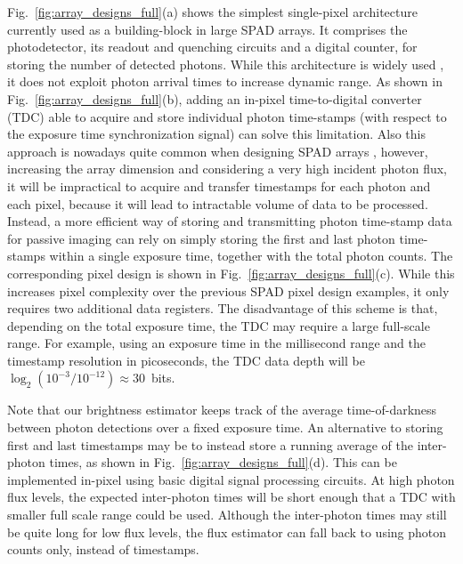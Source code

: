 Fig.~\ref{fig:array_designs_full}(a) shows the simplest single-pixel architecture
currently used as a building-block in large SPAD arrays. It comprises the
photodetector, its readout and quenching circuits and a digital counter, for
storing the number of detected photons. While this architecture is widely used
\cite{bronzi2015spad}, it does not exploit photon arrival times to increase
dynamic range. As shown in Fig.~\ref{fig:array_designs_full}(b), adding an
in-pixel time-to-digital converter (TDC) able to acquire and store individual
photon time-stamps (with respect to the exposure time synchronization signal)
can solve this limitation.  Also this approach is nowadays quite common when
designing SPAD arrays \cite{Henderson_2019, Portaluppi_2018}, however,
increasing the array dimension and considering a very high incident photon
flux, it will be impractical to acquire and transfer timestamps for each photon
and each pixel, because it will lead to intractable volume of data to be
processed. Instead, a more efficient way of storing and transmitting photon
time-stamp data for passive imaging can rely on simply storing the first and
last photon time-stamps within a single exposure time, together with the total
photon counts. The corresponding pixel design is shown in
Fig.~\ref{fig:array_designs_full}(c). While this increases pixel complexity
over the previous SPAD pixel design examples, it only requires two additional
data registers. The disadvantage of this scheme is that, depending on the total
exposure time, the TDC may require a large full-scale range.  For example,
using an exposure time in the millisecond range and the timestamp resolution in
picoseconds, the TDC data depth will be $\log_2(10^{-3}/10^{-12})\approx
30$~bits.

Note that our brightness estimator keeps track of the average time-of-darkness
between photon detections over a fixed exposure time. An alternative to storing
first and last timestamps may be to instead store a running average of the
inter-photon times, as shown in Fig.~\ref{fig:array_designs_full}(d). This can be
implemented in-pixel using basic digital signal processing circuits. At high
photon flux levels, the expected inter-photon times will be short enough that a
TDC with smaller full scale range could be used. Although the inter-photon
times may still be quite long for low flux levels, the flux estimator can fall
back to using photon counts only, instead of timestamps.

